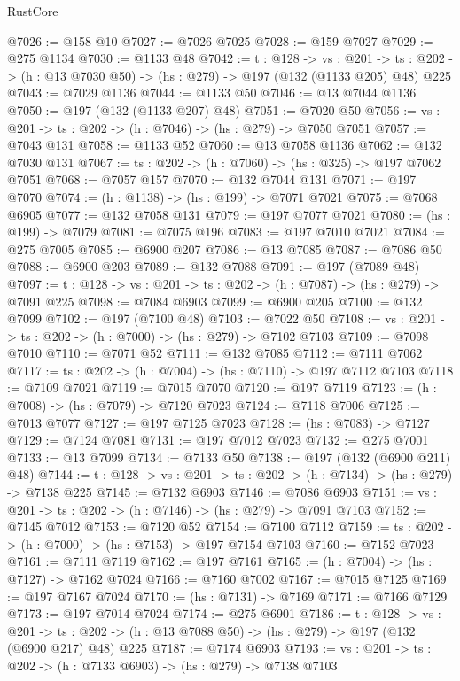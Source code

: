 \begin{lexlean}{RustCore}
\begin{coremodule}
@7026 := @158 @10
@7027 := @7026 @7025
@7028 := @159 @7027
@7029 := @275 @1134
@7030 := @1133 @48
@7042 := {t : @128} ->
  {vs : @201} ->
  {ts : @202} -> (h : @13 @7030 @50) -> (hs : @279) -> @197 (@132 (@1133 @205) @48) @225
@7043 := @7029 @1136
@7044 := @1133 @50
@7046 := @13 @7044 @1136
@7050 := @197 (@132 (@1133 @207) @48)
@7051 := @7020 @50
@7056 := {vs : @201} -> {ts : @202} -> (h : @7046) -> (hs : @279) -> @7050 @7051
@7057 := @7043 @131
@7058 := @1133 @52
@7060 := @13 @7058 @1136
@7062 := @132 @7030 @131
@7067 := {ts : @202} -> (h : @7060) -> (hs : @325) -> @197 @7062 @7051
@7068 := @7057 @157
@7070 := @132 @7044 @131
@7071 := @197 @7070
@7074 := (h : @1138) -> (hs : @199) -> @7071 @7021
@7075 := @7068 @6905
@7077 := @132 @7058 @131
@7079 := @197 @7077 @7021
@7080 := (hs : @199) -> @7079
@7081 := @7075 @196
@7083 := @197 @7010 @7021
@7084 := @275 @7005
@7085 := @6900 @207
@7086 := @13 @7085
@7087 := @7086 @50
@7088 := @6900 @203
@7089 := @132 @7088
@7091 := @197 (@7089 @48)
@7097 := {t : @128} -> {vs : @201} -> {ts : @202} -> (h : @7087) -> (hs : @279) -> @7091 @225
@7098 := @7084 @6903
@7099 := @6900 @205
@7100 := @132 @7099
@7102 := @197 (@7100 @48)
@7103 := @7022 @50
@7108 := {vs : @201} -> {ts : @202} -> (h : @7000) -> (hs : @279) -> @7102 @7103
@7109 := @7098 @7010
@7110 := @7071 @52
@7111 := @132 @7085
@7112 := @7111 @7062
@7117 := {ts : @202} -> (h : @7004) -> (hs : @7110) -> @197 @7112 @7103
@7118 := @7109 @7021
@7119 := @7015 @7070
@7120 := @197 @7119
@7123 := (h : @7008) -> (hs : @7079) -> @7120 @7023
@7124 := @7118 @7006
@7125 := @7013 @7077
@7127 := @197 @7125 @7023
@7128 := (hs : @7083) -> @7127
@7129 := @7124 @7081
@7131 := @197 @7012 @7023
@7132 := @275 @7001
@7133 := @13 @7099
@7134 := @7133 @50
@7138 := @197 (@132 (@6900 @211) @48)
@7144 := {t : @128} -> {vs : @201} -> {ts : @202} -> (h : @7134) -> (hs : @279) -> @7138 @225
@7145 := @7132 @6903
@7146 := @7086 @6903
@7151 := {vs : @201} -> {ts : @202} -> (h : @7146) -> (hs : @279) -> @7091 @7103
@7152 := @7145 @7012
@7153 := @7120 @52
@7154 := @7100 @7112
@7159 := {ts : @202} -> (h : @7000) -> (hs : @7153) -> @197 @7154 @7103
@7160 := @7152 @7023
@7161 := @7111 @7119
@7162 := @197 @7161
@7165 := (h : @7004) -> (hs : @7127) -> @7162 @7024
@7166 := @7160 @7002
@7167 := @7015 @7125
@7169 := @197 @7167 @7024
@7170 := (hs : @7131) -> @7169
@7171 := @7166 @7129
@7173 := @197 @7014 @7024
@7174 := @275 @6901
@7186 := {t : @128} ->
  {vs : @201} ->
  {ts : @202} -> (h : @13 @7088 @50) -> (hs : @279) -> @197 (@132 (@6900 @217) @48) @225
@7187 := @7174 @6903
@7193 := {vs : @201} -> {ts : @202} -> (h : @7133 @6903) -> (hs : @279) -> @7138 @7103

\end{coremodule}
\end{lexlean}
